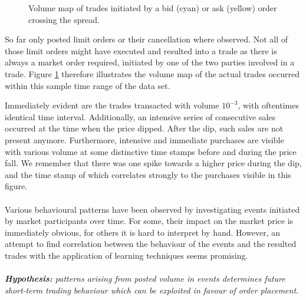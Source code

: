 \begin{figure}[H]
    \centering
    \caption{Volume map of trades initiated by a bid (cyan) or ask (yellow) order crossing the spread.}
    \label{fig:data-volmap-traded}
\end{figure}

So far only posted limit orders or their cancellation where observed.
Not all of those limit orders might have executed and resulted into a trade as there is always a market order required, initiated by one of the two parties involved in a trade.
Figure \ref{fig:data-volmap-traded} therefore illustrates the volume map of the actual trades occurred within this sample time range of the data set.

Immediately evident are the trades transacted with volume $10^{-3}$, with oftentimes identical time interval.
Additionally, an intensive series of consecutive sales occurred at the time when the price dipped.
After the dip, such sales are not present anymore.
Furthermore, intensive and immediate purchases are visible with various volume at some distinctive time stamps before and during the price fall.
We remember that there was one spike towards a higher price during the dip, and the time stamp of which correlates strongly to the purchases visible in this figure.
\\
\\
Various behavioural patterns have been observed by investigating events initiated by market participants over time.
For some, their impact on the market price is immediately obvious, for others it is hard to interpret by hand.
However, an attempt to find correlation between the behaviour of the events and the resulted trades with the application of learning techniques seems promising.
\\
\\
\textit{\textbf{Hypothesis:} patterns arising from posted volume in events determines future short-term trading behaviour which can be exploited in favour of order placement.}


